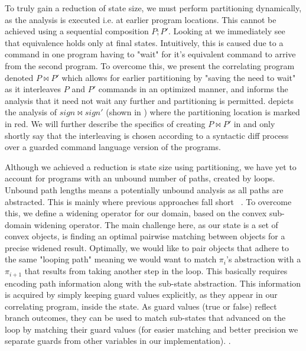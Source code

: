 To truly gain a reduction of state size, we must perform partitioning dynamically, as the analysis is executed i.e. at earlier program locations. This cannot be achieved using a sequential composition $P;P'$. Looking at  we immediately see that equivalence holds only at final states. Intuitively, this is caused due to a command in one program having to "wait" for it's equivalent command to arrive from the second program. To overcome this, we present the correlating program denoted $P \bowtie P'$ which allows for earlier partitioning by "saving the need to wait" as it interleaves $P$ and $P'$ commands in an optimized manner, and informs the analysis that it need not wait any further and partitioning is permitted.  depicts the analysis of $sign \bowtie sign'$ (shown in ) where the partitioning location is marked in red. We will further describe the specifics of creating $P \bowtie P'$ in  and only shortly say that the interleaving is chosen according to a syntactic diff process over a guarded command language version of the programs.



Although we achieved a reduction is state size using partitioning, we have yet to account for programs with an unbound number of paths, created by loops. Unbound path lengths means a potentially unbound analysis as all paths are abstracted. This is mainly where previous approaches fall short ~\cite{}. To overcome this, we define a widening operator for our domain, based on the convex sub-domain widening operator. The main challenge here, as our state is a set of convex objects, is finding an optimal pairwise matching between objects for a precise widened result. Optimally, we would like to pair objects that adhere to the same "looping path" meaning we would want to match $\pi_i$'s abstraction with a $\pi_{i+1}$ that results from taking another step in the loop. This basically requires encoding path information along with the sub-state abstraction. This information is acquired by simply keeping guard values explicitly, as they appear in our correlating program, inside the state. As guard values (true or false) reflect branch outcomes, they can be used to match sub-states that advanced on the loop by matching their guard values (for easier matching and better precision we separate guards from other variables in our implementation). .




